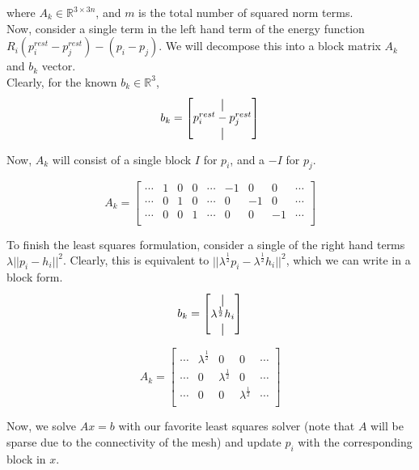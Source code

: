 \documentclass[a4paper]{article}
\newcommand*{\vertbar}{\rule[-1ex]{0.5pt}{2.5ex}}
\begin{document}
where $A_k \in \mathbb{R}^{3 \times 3n}$, and $m$ is the total number of squared norm terms. \\

Now, consider a single term in the left hand term of the energy function $R_i(p_i^{rest} - p_j^{rest}) - (p_i - p_j)$. We will decompose this into a block matrix $A_k$ and $b_k$ vector. \\

Clearly, for the known $b_k \in \mathbb{R}^3$,
\[
    b_k = \begin{bmatrix}
        \vertbar \\
        p_i^{rest} - p_j^{rest} \\
        \vertbar \\
        \end{bmatrix}
\]

Now, $A_k$ will consist of a single block $I$ for $p_i$, and a $-I$ for $p_j$.

\[
    A_k = \begin{bmatrix}
        \cdots & 1 & 0 & 0 & \cdots & -1 &  0 &  0 & \cdots \\
        \cdots & 0 & 1 & 0 & \cdots &  0 & -1 &  0 & \cdots \\
        \cdots & 0 & 0 & 1 & \cdots &  0 &  0 & -1 & \cdots \\
        \end{bmatrix}
\]

To finish the least squares formulation, consider a single of the right hand terms $\lambda ||p_i - h_i||^2$. Clearly, this is equivalent to $||\lambda^{\frac{1}{2}} p_i - \lambda^{\frac{1}{2}} h_i||^2$, which we can write in a block form.
\[
    b_k = \begin{bmatrix}
        \vertbar \\
        \lambda^{\frac{1}{2}} h_i \\
        \vertbar \\
        \end{bmatrix}
\]

\[
    A_k = \begin{bmatrix}
        \cdots & \lambda^{\frac{1}{2}} & 0 & 0 & \cdots \\
        \cdots & 0 & \lambda^{\frac{1}{2}} & 0 & \cdots \\
        \cdots & 0 & 0 & \lambda^{\frac{1}{2}} & \cdots \\
        \end{bmatrix}
\]

Now, we solve $Ax = b$ with our favorite least squares solver (note that $A$ will be sparse due to the connectivity of the mesh) and update $p_i$ with the corresponding block in $x$. \\
\end{document}
